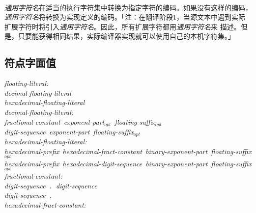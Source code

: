 \paragraph{}
\textit{通用字符名}在适当的执行字符集中转换为指定字符的编码。如果没有这样的编码，
\textit{通用字符名}将转换为实现定义的编码。「注：在翻译阶段1，当源文本中遇到实际
扩展字符时将引入\textit{通用字符名}。因此，所有扩展字符都用\textit{通用字符名}来
描述。但是，只要能获得相同结果，实际编译器实现就可以使用自己的本机字符集。」

\subsection{符点字面值}
\noindent \mbox{\qquad \textit{floating-literal:}}                            \\
\mbox{\qquad \qquad \textit{decimal-floating-literal}}                        \\
\mbox{\qquad \qquad \textit{hexadecimal-floating-literal}}                    \\
\noindent \mbox{\qquad \textit{decimal-floating-literal:}}                    \\
\mbox{\qquad \qquad \textit{fractional-constant exponent-part$_{opt}$
                              floating-suffix$_{opt}$}}                       \\
\mbox{\qquad \qquad \textit{digit-sequence exponent-part
                              floating-suffix$_{opt}$}}                       \\
\noindent \mbox{\qquad \textit{hexadecimal-floating-literal:}}                \\
\mbox{\qquad \qquad \textit{hexadecimal-prefix hexadecimal-fract-constant
                              binary-exponent-part floating-suffix$_{opt}$}}  \\
\mbox{\qquad \qquad \textit{hexadecimal-prefix hexadecimal-digit-sequence
                              binary-exponent-part floating-suffix$_{opt}$}}  \\
\noindent \mbox{\qquad \textit{fractional-constant:}}                         \\
\mbox{\qquad \qquad \textit{digit-sequence} \texttt{.}
                    \textit{digit-sequence}}                                  \\
\mbox{\qquad \qquad \textit{digit-sequence} \texttt{.}}                       \\
\noindent \mbox{\qquad \textit{hexadecimal-fract-constant:}}                  \\

